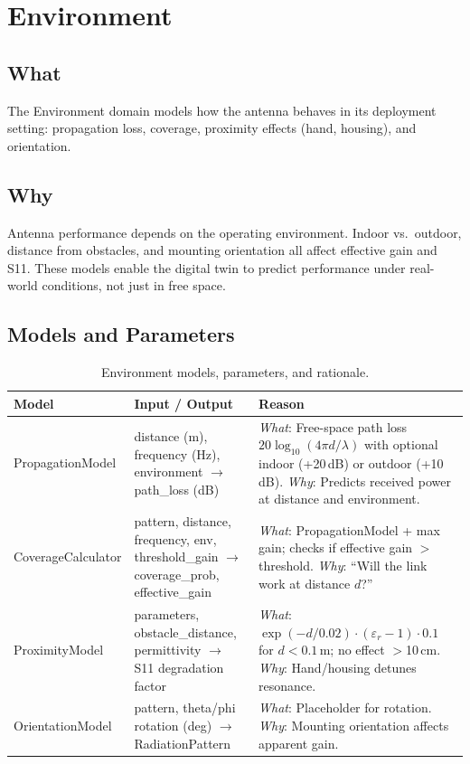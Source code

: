 \documentclass[11pt,a4paper]{article}
\begin{document}
\section{Environment}

\subsection{What}
The Environment domain models how the antenna behaves in its deployment setting: propagation loss, coverage, proximity effects (hand, housing), and orientation.

\subsection{Why}
Antenna performance depends on the operating environment. Indoor vs.\ outdoor, distance from obstacles, and mounting orientation all affect effective gain and S11. These models enable the digital twin to predict performance under real-world conditions, not just in free space.

\subsection{Models and Parameters}

\begin{table}[htbp]
\centering
\small
\begin{tabularx}{\textwidth}{@{}lXX@{}}
\toprule
\textbf{Model} & \textbf{Input / Output} & \textbf{Reason} \\
\midrule
PropagationModel & distance (m), frequency (Hz), environment $\to$ path\_loss (dB) & \emph{What}: Free-space path loss $20\log_{10}(4\pi d/\lambda)$ with optional indoor (+20\,dB) or outdoor (+10\,dB). \emph{Why}: Predicts received power at distance and environment. \\
\addlinespace
CoverageCalculator & pattern, distance, frequency, env, threshold\_gain $\to$ coverage\_prob, effective\_gain & \emph{What}: PropagationModel + max gain; checks if effective gain $>$ threshold. \emph{Why}: ``Will the link work at distance $d$?'' \\
\addlinespace
ProximityModel & parameters, obstacle\_distance, permittivity $\to$ S11 degradation factor & \emph{What}: $\exp(-d/0.02)\cdot(\varepsilon_r-1)\cdot0.1$ for $d{<}0.1$\,m; no effect $>$10\,cm. \emph{Why}: Hand/housing detunes resonance. \\
\addlinespace
OrientationModel & pattern, theta/phi rotation (deg) $\to$ RadiationPattern & \emph{What}: Placeholder for rotation. \emph{Why}: Mounting orientation affects apparent gain. \\
\bottomrule
\end{tabularx}
\caption{Environment models, parameters, and rationale.}
\end{table}
\end{document}
